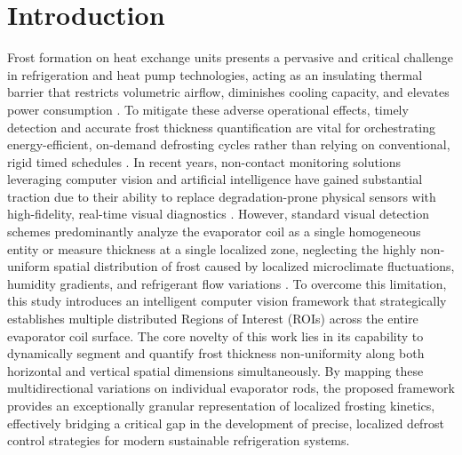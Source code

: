 \documentclass[a4paper,fleqn]{cas-dc}
\begin{document}
\section{Introduction}\label{sec:intro}
Frost formation on heat exchange units presents a pervasive and critical challenge in refrigeration and heat pump technologies, acting as an insulating thermal barrier that restricts volumetric airflow, diminishes cooling capacity, and elevates power consumption \citep{mehmood2025frost,wang2023eulerian}. To mitigate these adverse operational effects, timely detection and accurate frost thickness quantification are vital for orchestrating energy-efficient, on-demand defrosting cycles rather than relying on conventional, rigid timed schedules \citep{alcaraz2023virtual,chen2024utilizing}. In recent years, non-contact monitoring solutions leveraging computer vision and artificial intelligence have gained substantial traction due to their ability to replace degradation-prone physical sensors with high-fidelity, real-time visual diagnostics \citep{akbar2024deep,elahi2026transformer}. However, standard visual detection schemes predominantly analyze the evaporator coil as a single homogeneous entity or measure thickness at a single localized zone, neglecting the highly non-uniform spatial distribution of frost caused by localized microclimate fluctuations, humidity gradients, and refrigerant flow variations \citep{babadi2023localized}. To overcome this limitation, this study introduces an intelligent computer vision framework that strategically establishes multiple distributed Regions of Interest (ROIs) across the entire evaporator coil surface. The core novelty of this work lies in its capability to dynamically segment and quantify frost thickness non-uniformity along both horizontal and vertical spatial dimensions simultaneously. By mapping these multidirectional variations on individual evaporator rods, the proposed framework provides an exceptionally granular representation of localized frosting kinetics, effectively bridging a critical gap in the development of precise, localized defrost control strategies for modern sustainable refrigeration systems.
\end{document}
